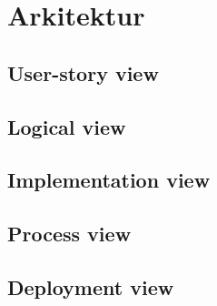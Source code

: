 \chapter{Arkitektur}

\lipsum[2]

\section{User-story view}

\section{Logical view}

\section{Implementation view} %

\section{Process view}

\section{Deployment view} %

